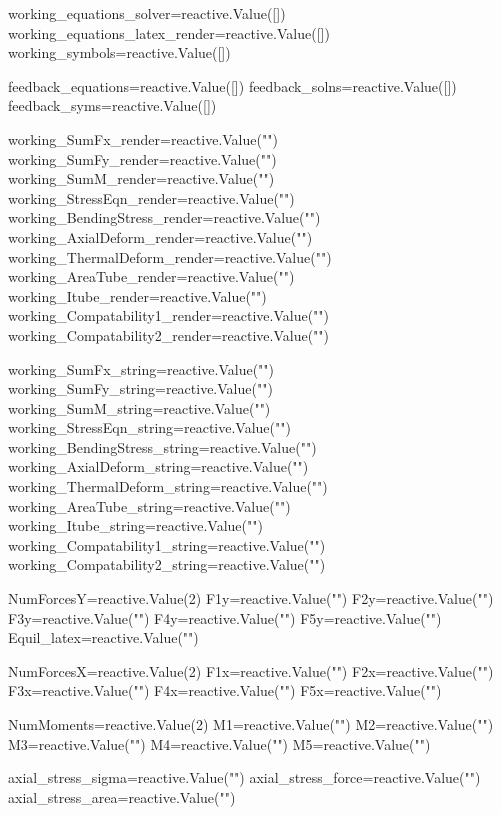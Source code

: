 \documentclass[
  letterpaper,
  DIV=11,
  numbers=noendperiod]{scrreprt}
\newenvironment{Shaded}{\begin{snugshade}}{\end{snugshade}}
\newcommand{\NormalTok}[1]{\textcolor[rgb]{0.00,0.23,0.31}{#1}}
\begin{document}
\begin{Shaded}
\begin{Highlighting}[]
\NormalTok{working\_equations\_solver=reactive.Value([])}
\NormalTok{working\_equations\_latex\_render=reactive.Value([])}
\NormalTok{working\_symbols=reactive.Value([])}

\NormalTok{feedback\_equations=reactive.Value([])}
\NormalTok{feedback\_solns=reactive.Value([])}
\NormalTok{feedback\_syms=reactive.Value([])}

\NormalTok{working\_SumFx\_render=reactive.Value("")}
\NormalTok{working\_SumFy\_render=reactive.Value("")}
\NormalTok{working\_SumM\_render=reactive.Value("")}
\NormalTok{working\_StressEqn\_render=reactive.Value("")}
\NormalTok{working\_BendingStress\_render=reactive.Value("")}
\NormalTok{working\_AxialDeform\_render=reactive.Value("")}
\NormalTok{working\_ThermalDeform\_render=reactive.Value("")}
\NormalTok{working\_AreaTube\_render=reactive.Value("")}
\NormalTok{working\_Itube\_render=reactive.Value("")}
\NormalTok{working\_Compatability1\_render=reactive.Value("")}
\NormalTok{working\_Compatability2\_render=reactive.Value("")}

\NormalTok{working\_SumFx\_string=reactive.Value("")}
\NormalTok{working\_SumFy\_string=reactive.Value("")}
\NormalTok{working\_SumM\_string=reactive.Value("")}
\NormalTok{working\_StressEqn\_string=reactive.Value("")}
\NormalTok{working\_BendingStress\_string=reactive.Value("")}
\NormalTok{working\_AxialDeform\_string=reactive.Value("")}
\NormalTok{working\_ThermalDeform\_string=reactive.Value("")}
\NormalTok{working\_AreaTube\_string=reactive.Value("")}
\NormalTok{working\_Itube\_string=reactive.Value("")}
\NormalTok{working\_Compatability1\_string=reactive.Value("")}
\NormalTok{working\_Compatability2\_string=reactive.Value("")}

\NormalTok{NumForcesY=reactive.Value(2)}
\NormalTok{F1y=reactive.Value("")}
\NormalTok{F2y=reactive.Value("")}
\NormalTok{F3y=reactive.Value("")}
\NormalTok{F4y=reactive.Value("")}
\NormalTok{F5y=reactive.Value("")}
\NormalTok{Equil\_latex=reactive.Value("")}

\NormalTok{NumForcesX=reactive.Value(2)}
\NormalTok{F1x=reactive.Value("")}
\NormalTok{F2x=reactive.Value("")}
\NormalTok{F3x=reactive.Value("")}
\NormalTok{F4x=reactive.Value("")}
\NormalTok{F5x=reactive.Value("")}

\NormalTok{NumMoments=reactive.Value(2)}
\NormalTok{M1=reactive.Value("")}
\NormalTok{M2=reactive.Value("")}
\NormalTok{M3=reactive.Value("")}
\NormalTok{M4=reactive.Value("")}
\NormalTok{M5=reactive.Value("")}

\NormalTok{axial\_stress\_sigma=reactive.Value("")}
\NormalTok{axial\_stress\_force=reactive.Value("")}
\NormalTok{axial\_stress\_area=reactive.Value("")}


\end{Highlighting}
\end{Shaded}
\end{document}
